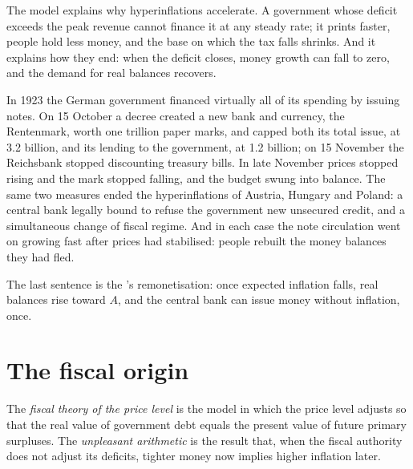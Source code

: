 The model explains why hyperinflations accelerate. A government whose deficit
exceeds the peak revenue cannot finance it at any steady rate; it prints faster,
people hold less money, and the base on which the tax falls shrinks. And it
explains how they end: when the deficit closes, money growth can fall to zero,
and the demand for real balances recovers.

\begin{record}[Germany, 1923]
In 1923 the German government financed virtually all of its spending by issuing
notes. On 15 October a decree created a new bank and currency, the Rentenmark,
worth one trillion paper marks, and capped both its total issue, at 3.2 billion,
and its lending to the government, at 1.2 billion; on 15 November the Reichsbank
stopped discounting treasury bills. In late November prices stopped rising and the
mark stopped falling, and the budget swung into balance. %
The same two measures ended the hyperinflations of Austria, Hungary and Poland: a
central bank legally bound to refuse the government new unsecured credit, and a
simultaneous change of fiscal regime. And in each case the note circulation went
on growing fast after prices had stabilised: people rebuilt the money balances
they had fled. %
\end{record}

The last sentence is the 's remonetisation: once expected inflation
falls, real balances rise toward $A$, and the central bank can issue money without
inflation, once.

\section{The fiscal origin}\label{sec:b3:inflation-evidence:fiscal}

\begin{definition}\label{def:b3:inflation-evidence:fiscal}
The \emph{fiscal theory of the price level} is the model in which the price level
adjusts so that the real value of government debt equals the present value of
future primary surpluses. The \emph{unpleasant arithmetic} is the result that,
when the fiscal authority does not adjust its deficits, tighter money now implies
higher inflation later.
\end{definition}

